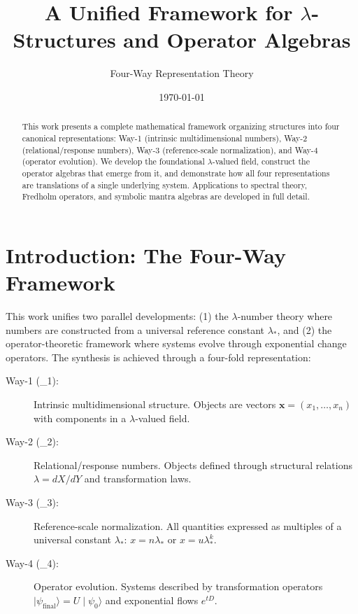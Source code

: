 \documentclass[12pt, reqno]{amsart}
\title{A Unified Framework for $\lambda$-Structures and Operator Algebras}
\author{Four-Way Representation Theory}
\date{\today}
\theoremstyle{plain}
\theoremstyle{definition}
\theoremstyle{remark}
\newcommand{\lstar}{\lambda_{*}}
\newcommand{\wayone}{\mathsf{W}_{1}}
\newcommand{\waytwo}{\mathsf{W}_{2}}
\newcommand{\waythree}{\mathsf{W}_{3}}
\newcommand{\wayfour}{\mathsf{W}_{4}}
\begin{document}
\maketitle

\begin{abstract}
This work presents a complete mathematical framework organizing structures into four canonical representations: 
Way-1 (intrinsic multidimensional numbers), Way-2 (relational/response numbers), Way-3 (reference-scale 
normalization), and Way-4 (operator evolution). We develop the foundational $\lambda$-valued field, construct 
the operator algebras that emerge from it, and demonstrate how all four representations are translations of a 
single underlying system. Applications to spectral theory, Fredholm operators, and symbolic mantra algebras are 
developed in full detail.
\end{abstract}

\tableofcontents

\newpage

\section{Introduction: The Four-Way Framework}

This work unifies two parallel developments: (1) the $\lambda$-number theory where numbers are constructed 
from a universal reference constant $\lstar$, and (2) the operator-theoretic framework where systems evolve 
through exponential change operators. The synthesis is achieved through a four-fold representation:

\begin{description}
\item[Way-1 (\wayone):] Intrinsic multidimensional structure. Objects are vectors
    $\mathbf{x} = (x_1,\ldots,x_n)$ with components in a $\lambda$-valued field.
    
\item[Way-2 (\waytwo):] Relational/response numbers. Objects defined through structural relations
    $\lambda = dX/dY$ and transformation laws.
    
\item[Way-3 (\waythree):] Reference-scale normalization. All quantities expressed as multiples of a universal
    constant $\lstar$: $x = n\lstar$ or $x = u\lstar^{k}$.
    
\item[Way-4 (\wayfour):] Operator evolution. Systems described by transformation operators
    $\mid \psi_{\text{final}}\rangle = U \mid \psi_0\rangle$ and exponential flows $e^{tD}$.
\end{description}
\end{document}

